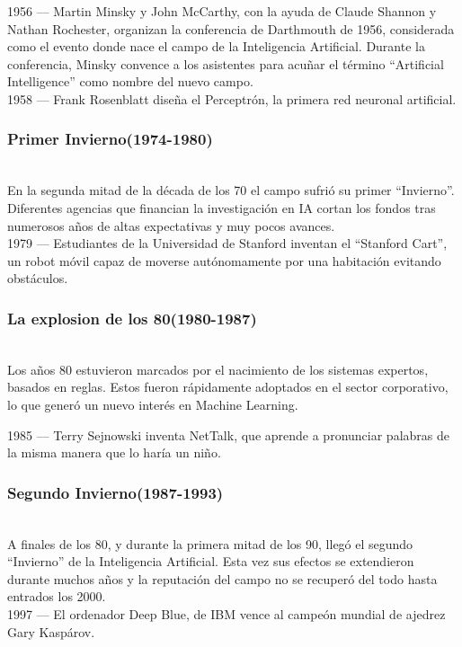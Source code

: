 \documentclass[a4paper,11pt]{article}
\begin{document}
	1956 — Martin Minsky y John McCarthy, con la ayuda de Claude Shannon
	y Nathan Rochester, organizan la conferencia de Darthmouth de 1956, considerada como el 
	evento donde nace el campo de la Inteligencia Artificial. Durante la conferencia, Minsky 
	convence a los asistentes para acuñar el término “Artificial Intelligence” como nombre 
	del nuevo campo.\\
	
	
	1958 — Frank Rosenblatt diseña el Perceptrón, la primera red neuronal artificial.
	
	\subsubsection{Primer Invierno(1974-1980)}\\
	En la segunda mitad de la década de los 70 el campo sufrió su 
	primer “Invierno”. Diferentes agencias que financian la 
	investigación en IA cortan los fondos tras numerosos años de 
	altas expectativas y muy pocos avances.\\
	
	
	1979 — Estudiantes de la Universidad de Stanford inventan el  
	“Stanford Cart”, un robot móvil capaz de moverse autónomamente
	por una habitación evitando obstáculos.
	
	\subsubsection{La explosion de los 80(1980-1987)}\\
	Los años 80 estuvieron marcados por el nacimiento de los sistemas expertos, basados en reglas. Estos fueron rápidamente adoptados
	en el sector corporativo, lo que generó un nuevo interés en Machine Learning.
	
	1985 — Terry Sejnowski inventa NetTalk, que aprende a pronunciar
	palabras de la misma manera que lo haría un niño.
	
	\subsubsection{Segundo Invierno(1987-1993)}\\
	A finales de los 80, y durante la primera mitad de los 90, llegó
	el segundo “Invierno” de la Inteligencia Artificial. Esta vez sus efectos se extendieron durante muchos años y la reputación 
	del campo no se recuperó del todo hasta entrados los 2000.\\
	1997 — El ordenador Deep Blue, de IBM vence al campeón mundial de ajedrez Gary Kaspárov.
\end{document}
